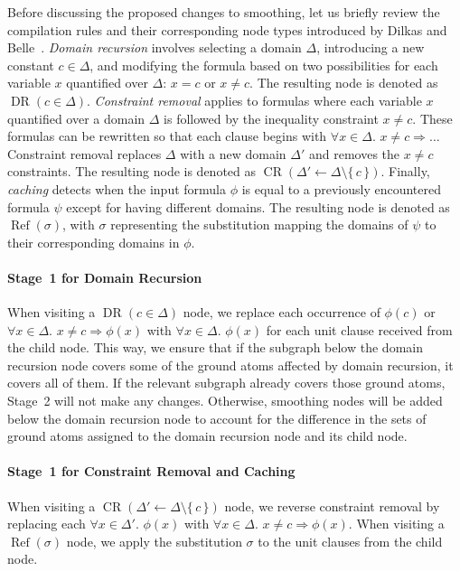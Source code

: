 \documentclass{article}
\theoremstyle{remark}
\DeclareMathOperator{\CR}{CR}
\DeclareMathOperator{\DR}{DR}
\DeclareMathOperator{\Reff}{Ref}
\begin{document}
Before discussing the proposed changes to smoothing, let us briefly review the
compilation rules and their corresponding node types introduced by Dilkas and
Belle~. \emph{Domain recursion} involves
selecting a domain $\Delta$, introducing a new constant $c \in \Delta$, and
modifying the formula based on two possibilities for each variable $x$
quantified over $\Delta$: $x = c$ or $x \ne c$. The resulting node is denoted as
$\DR(c \in \Delta)$. \emph{Constraint removal} applies to formulas where each
variable $x$ quantified over a domain $\Delta$ is followed by the inequality
constraint $x \ne c$. These formulas can be rewritten so that each clause begins
with $\forall x \in \Delta\text{. }x \ne c \Rightarrow \ldots$ Constraint
removal replaces $\Delta$ with a new domain $\Delta'$ and removes the $x \ne c$
constraints. The resulting node is denoted as
$\CR(\Delta' \gets \Delta \setminus \{\,c\,\})$. Finally, \emph{caching} detects
when the input formula $\phi$ is equal to a previously encountered formula
$\psi$ except for having different domains. The resulting node is denoted as
$\Reff(\sigma)$, with $\sigma$ representing the substitution mapping the domains
of $\psi$ to their corresponding domains in $\phi$.

\paragraph{Stage~1 for Domain Recursion}
When visiting a $\DR(c \in \Delta)$ node, we replace each occurrence of
$\phi(c)$ or $\forall x \in \Delta\text{. } x \ne c \Rightarrow \phi(x)$ with
$\forall x \in \Delta\text{. }\phi(x)$ for each unit clause received from the
child node. This way, we ensure that if the subgraph below the domain recursion
node covers some of the ground atoms affected by domain recursion, it covers all
of them. If the relevant subgraph already covers those ground atoms, Stage~2
will not make any changes. Otherwise, smoothing nodes will be added below the
domain recursion node to account for the difference in the sets of ground atoms
assigned to the domain recursion node and its child node.

\paragraph{Stage~1 for Constraint Removal and Caching}
When visiting a $\CR(\Delta' \gets \Delta \setminus \{\,c\,\})$ node, we reverse
constraint removal by replacing each $\forall x \in \Delta'\text{. }\phi(x)$
with $\forall x \in \Delta\text{. }x \ne c \Rightarrow \phi(x)$. When visiting a
$\Reff(\sigma)$ node, we apply the substitution $\sigma$ to the unit clauses
from the child node.
\end{document}
